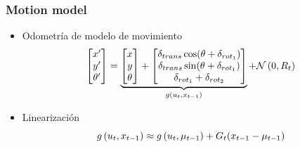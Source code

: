 \begin{frame}
    \frametitle{Motion model}
    
    \begin{itemize}
        \item Odometría de modelo de movimiento
        \begin{equation*}
            \begin{bmatrix}
                x^{\prime} \\
                y^{\prime} \\
                \theta^{\prime}
            \end{bmatrix} =
            \underbrace{
                \begin{bmatrix}
                x \\
                y \\
                \theta
            \end{bmatrix} +
            \begin{bmatrix}
                \delta_{trans}\cos(\theta+\delta_{rot_{1}}) \\
                \delta_{trans}\sin(\theta+\delta_{rot_{1}}) \\
                \delta_{rot_{1}} + \delta_{rot_{2}}
            \end{bmatrix}
            }_{g\left( u_{t}, x_{t-1} \right)} + \mathcal{N}\left( {0}, {R_{t}} \right)
        \end{equation*}
        \item Linearización
        \begin{equation*}
            g\left( u_{t}, x_{t-1} \right) \approx             g\left( u_{t}, \mu_{t-1} \right) + G_{t}(x_{t-1}-\mu_{t-1})
        \end{equation*}
    \end{itemize}
    
\end{frame}

